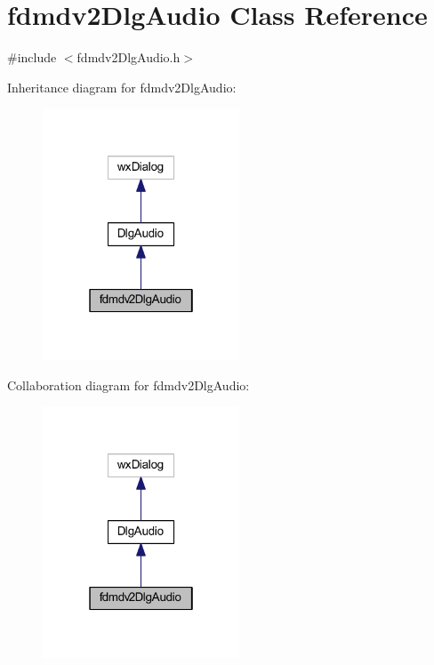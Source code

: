 \hypertarget{classfdmdv2_dlg_audio}{\section{fdmdv2\-Dlg\-Audio Class Reference}
\label{classfdmdv2_dlg_audio}
}


{\ttfamily \#include $<$fdmdv2\-Dlg\-Audio.\-h$>$}



Inheritance diagram for fdmdv2\-Dlg\-Audio\-:\nopagebreak
\begin{figure}[H]
\begin{center}
\leavevmode
\includegraphics[width=166pt]{classfdmdv2_dlg_audio__inherit__graph}
\end{center}
\end{figure}


Collaboration diagram for fdmdv2\-Dlg\-Audio\-:\nopagebreak
\begin{figure}[H]
\begin{center}
\leavevmode
\includegraphics[width=166pt]{classfdmdv2_dlg_audio__coll__graph}
\end{center}
\end{figure}
